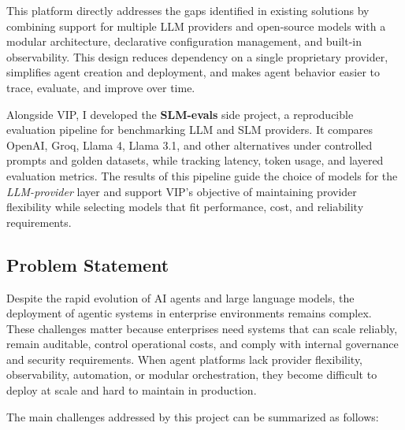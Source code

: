 This platform directly addresses the gaps identified in existing solutions by combining support for multiple LLM providers and open-source models with a modular architecture, declarative configuration management, and built-in observability. This design reduces dependency on a single proprietary provider, simplifies agent creation and deployment, and makes agent behavior easier to trace, evaluate, and improve over time.

Alongside VIP, I developed the \textbf{SLM-evals} side project, a reproducible evaluation pipeline for benchmarking LLM and SLM providers. It compares OpenAI, Groq, Llama 4, Llama 3.1, and other alternatives under controlled prompts and golden datasets, while tracking latency, token usage, and layered evaluation metrics. The results of this pipeline guide the choice of models for the \textit{LLM-provider} layer and support VIP's objective of maintaining provider flexibility while selecting models that fit performance, cost, and reliability requirements.

\vspace{1em}

\subsection{Problem Statement}

Despite the rapid evolution of AI agents and large language models, the deployment of agentic systems in enterprise environments remains complex. These challenges matter because enterprises need systems that can scale reliably, remain auditable, control operational costs, and comply with internal governance and security requirements. When agent platforms lack provider flexibility, observability, automation, or modular orchestration, they become difficult to deploy at scale and hard to maintain in production.

The main challenges addressed by this project can be summarized as follows:

